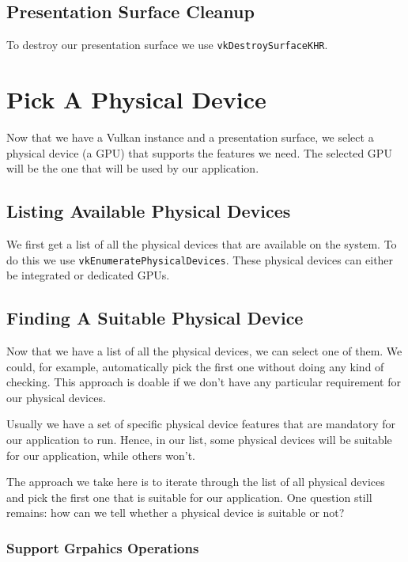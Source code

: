 \subsection{Presentation Surface Cleanup}

To destroy our presentation surface we use \texttt{vkDestroySurfaceKHR}.

\section{Pick A Physical Device}

Now that we have a Vulkan instance and a presentation surface, we select
a physical device (a GPU) that supports the features we need.
The selected GPU will be the one that will be used by our application.

\subsection{Listing Available Physical Devices}

We first get a list of all the physical devices that are available on the
system.
To do this we use \texttt{vkEnumeratePhysicalDevices}.
These physical devices can either be integrated or dedicated GPUs.

\subsection{Finding A Suitable Physical Device}

Now that we have a list of all the physical devices, we can select one of them.
We could, for example, automatically pick the first one without doing any kind
of checking.
This approach is doable if we don't have any particular requirement for our
physical devices.

Usually we have a set of specific physical device features that are mandatory
for our application to run.
Hence, in our list, some physical devices will be suitable for our application, while
others won't.

The approach we take here is to iterate through the list of all physical devices and
pick the first one that is suitable for our application.
One question still remains: how can we tell whether a physical device is suitable or not?

\subsubsection{Support Grpahics Operations}

